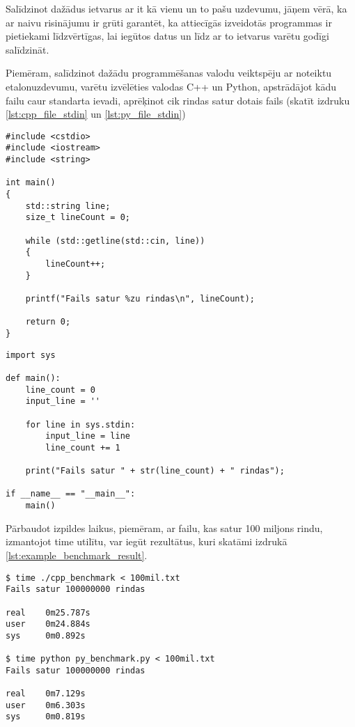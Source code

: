 Salīdzinot dažādus ietvarus ar it kā vienu un to pašu uzdevumu, jāņem vērā, ka
ar naivu risinājumu ir grūti garantēt, ka attiecīgās izveidotās programmas ir
pietiekami līdzvērtīgas, lai iegūtos datus un līdz ar to ietvarus varētu godīgi
salīdzināt.

Piemēram, salīdzinot dažādu programmēšanas valodu veiktspēju ar noteiktu
etalonuzdevumu, varētu izvēlēties valodas C++ un Python, apstrādājot kādu failu
caur standarta ievadi, aprēķinot cik rindas satur dotais fails (skatīt izdruku
\ref{lst:cpp_file_stdin} un \ref{lst:py_file_stdin})

\begin{lstlisting}[caption={Vienkārša faila apstrāde valodā C++ caur standarta ievadi},
  label=lst:cpp_file_stdin,
  captionpos=t
]
#include <cstdio>
#include <iostream>
#include <string>

int main()
{
	std::string line;
	size_t lineCount = 0;

	while (std::getline(std::cin, line))
	{
		lineCount++;
	}

	printf("Fails satur %zu rindas\n", lineCount);

	return 0;
}
\end{lstlisting}


\begin{lstlisting}[caption={Vienkārša faila apstrāde valodā Python caur standarta ievadi},
  label=lst:py_file_stdin,
  captionpos=t
]
import sys 

def main():
    line_count = 0
    input_line = ''

    for line in sys.stdin:
        input_line = line
        line_count += 1

    print("Fails satur " + str(line_count) + " rindas");

if __name__ == "__main__":
    main()
\end{lstlisting}

Pārbaudot izpildes laikus, piemēram, ar failu, kas satur 100 miljons rindu,
izmantojot time\cite{time_man_page} utilītu, var iegūt rezultātus, kuri skatāmi
izdrukā \ref{lst:example_benchmark_result}.

\begin{lstlisting}[caption={Etalonuzdevuma rezultāti failam ar 100 miljoniem rindu},
  label=lst:example_benchmark_result,
  captionpos=t
]
$ time ./cpp_benchmark < 100mil.txt 
Fails satur 100000000 rindas

real    0m25.787s
user    0m24.884s
sys     0m0.892s

$ time python py_benchmark.py < 100mil.txt 
Fails satur 100000000 rindas

real    0m7.129s
user    0m6.303s
sys     0m0.819s
\end{lstlisting}

